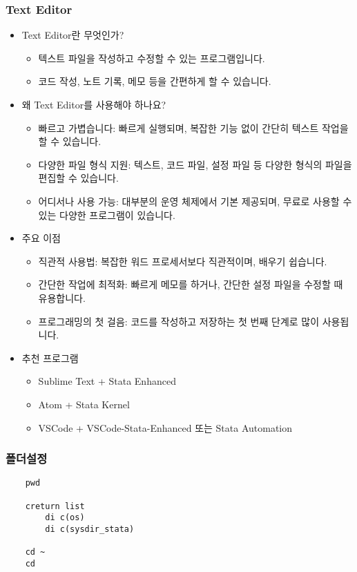 \documentclass[aspectratio=169,xcolor=dvipsnames,handout]{beamer}
\begin{document}
\begin{frame}[allowframebreaks]
    \frametitle{Text Editor}
    \begin{itemize}[<+->]
        \item Text Editor란 무엇인가?
        \begin{itemize}[<+->]
            \item 텍스트 파일을 작성하고 수정할 수 있는 프로그램입니다.
            \item 코드 작성, 노트 기록, 메모 등을 간편하게 할 수 있습니다.
        \end{itemize}
        \item 왜 Text Editor를 사용해야 하나요?
        \begin{itemize}[<+->]
            \item 빠르고 가볍습니다: 빠르게 실행되며, 복잡한 기능 없이 간단히 텍스트 작업을 할 수 있습니다.
            \item 다양한 파일 형식 지원: 텍스트, 코드 파일, 설정 파일 등 다양한 형식의 파일을 편집할 수 있습니다.
            \item 어디서나 사용 가능: 대부분의 운영 체제에서 기본 제공되며, 무료로 사용할 수 있는 다양한 프로그램이 있습니다.
        \end{itemize}
        \item 주요 이점
        \begin{itemize}[<+->]
            \item 직관적 사용법: 복잡한 워드 프로세서보다 직관적이며, 배우기 쉽습니다.
            \item 간단한 작업에 최적화: 빠르게 메모를 하거나, 간단한 설정 파일을 수정할 때 유용합니다.
            \item 프로그래밍의 첫 걸음: 코드를 작성하고 저장하는 첫 번째 단계로 많이 사용됩니다.
        \end{itemize}
        \item 추천 프로그램
        \begin{itemize}[<+->]
            \item Sublime Text + Stata Enhanced
            \item Atom + Stata Kernel
            \item VSCode + VSCode-Stata-Enhanced 또는 Stata Automation
        \end{itemize}
    \end{itemize}
\end{frame}


\begin{frame}[ fragile]
\frametitle{폴더설정}
    \begin{verbatim}
    pwd

    creturn list
        di c(os)
        di c(sysdir_stata)

    cd ~
    cd
    \end{verbatim}
\end{frame}
\end{document}
